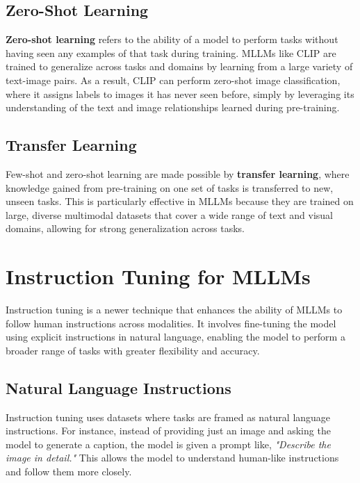 \subsection{Zero-Shot Learning}

\textbf{Zero-shot learning} refers to the ability of a model to perform tasks without having seen any examples of that task during training. MLLMs like CLIP are trained to generalize across tasks and domains by learning from a large variety of text-image pairs. As a result, CLIP can perform zero-shot image classification, where it assigns labels to images it has never seen before, simply by leveraging its understanding of the text and image relationships learned during pre-training.

\subsection{Transfer Learning}

Few-shot and zero-shot learning are made possible by \textbf{transfer learning}, where knowledge gained from pre-training on one set of tasks is transferred to new, unseen tasks. This is particularly effective in MLLMs because they are trained on large, diverse multimodal datasets that cover a wide range of text and visual domains, allowing for strong generalization across tasks.

\section{Instruction Tuning for MLLMs}

Instruction tuning is a newer technique that enhances the ability of MLLMs to follow human instructions across modalities. It involves fine-tuning the model using explicit instructions in natural language, enabling the model to perform a broader range of tasks with greater flexibility and accuracy.

\subsection{Natural Language Instructions}

Instruction tuning uses datasets where tasks are framed as natural language instructions. For instance, instead of providing just an image and asking the model to generate a caption, the model is given a prompt like, \textit{"Describe the image in detail."} This allows the model to understand human-like instructions and follow them more closely.


